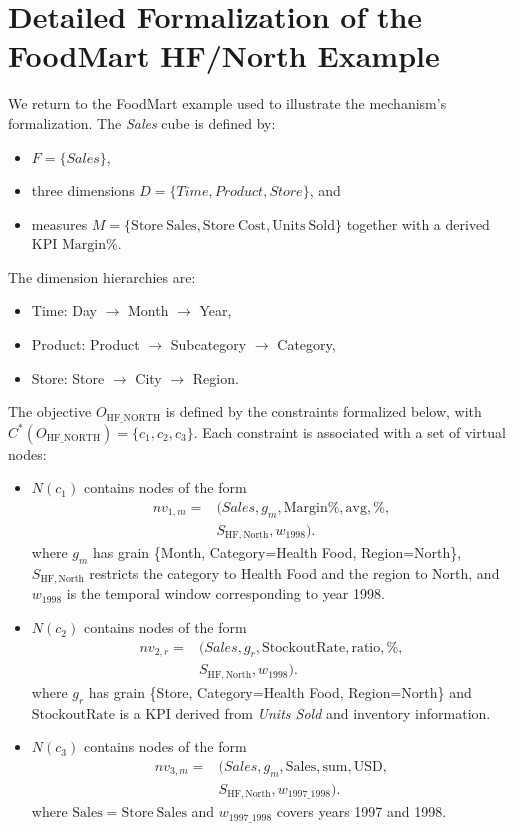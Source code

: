 \section{Detailed Formalization of the FoodMart HF/North Example}
\label{app:foodmart}

We return to the FoodMart example used to illustrate the mechanism's formalization. The \textit{Sales} cube is defined by:
\begin{itemize}
  \item $F=\{\textit{Sales}\}$,
  \item three dimensions $D=\{\textit{Time},\textit{Product},\textit{Store}\}$, and
  \item measures $M=\{\mathrm{Store\ Sales},\mathrm{Store\ Cost},\mathrm{Units\ Sold}\}$ together with a derived KPI $\mathrm{Margin\%}$.
\end{itemize}

The dimension hierarchies are:
\begin{itemize}
  \item Time: Day $\rightarrow$ Month $\rightarrow$ Year,
  \item Product: Product $\rightarrow$ Subcategory $\rightarrow$ Category,
  \item Store: Store $\rightarrow$ City $\rightarrow$ Region.
\end{itemize}

The objective $O_{\mathrm{HF\_NORTH}}$ is defined by the constraints formalized below, with $C^*(O_{\mathrm{HF\_NORTH}})=\{c_1,c_2,c_3\}$. Each constraint is associated with a set of virtual nodes:
\begin{itemize}
  \item $N(c_1)$ contains nodes of the form
  \[
  \begin{aligned}
  nv_{1,m}={}&(\textit{Sales},g_m,\mathrm{Margin\%},\mathrm{avg},\%,\\
             &S_{\mathrm{HF,North}},w_{1998}).
  \end{aligned}
  \]
  where $g_m$ has grain \{Month, Category=Health Food, Region=North\}, $S_{\mathrm{HF,North}}$ restricts the category to Health Food and the region to North, and $w_{1998}$ is the temporal window corresponding to year 1998.
  \item $N(c_2)$ contains nodes of the form
  \[
  \begin{aligned}
  nv_{2,r}={}&(\textit{Sales},g_r,\mathrm{StockoutRate},\mathrm{ratio},\%,\\
             &S_{\mathrm{HF,North}},w_{1998}).
  \end{aligned}
  \]
  where $g_r$ has grain \{Store, Category=Health Food, Region=North\} and $\mathrm{StockoutRate}$ is a KPI derived from \textit{Units Sold} and inventory information.
  \item $N(c_3)$ contains nodes of the form
  \[
  \begin{aligned}
  nv_{3,m}={}&(\textit{Sales},g_m,\mathrm{Sales},\mathrm{sum},\text{USD},\\
             &S_{\mathrm{HF,North}},w_{1997\_1998}).
  \end{aligned}
  \]
  where $\mathrm{Sales}=\mathrm{Store\ Sales}$ and $w_{1997\_1998}$ covers years 1997 and 1998.
\end{itemize}

